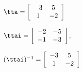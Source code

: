 {$\tta = \left[
\begin{array}{cc}
  -3 & 5 \\
 1 & -2
\end{array}\right]$
}
{$\ttai = \left[
\begin{array}{cc}
 -2 & -5\\
 -1 & -3
\end{array}
\right]$,

$(\ttai)^{-1} = \left[
\begin{array}{cc}
 -3 & 5 \\
 1 & -2
 \end{array}\right]$
}
